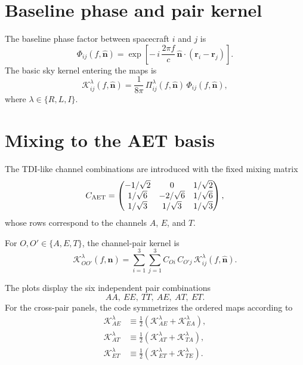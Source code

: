 \documentclass[11pt]{article}
\begin{document}
\section{Baseline phase and pair kernel}

The baseline phase factor between spacecraft $i$ and $j$ is
\begin{equation}
\Phi_{ij}(f,\hat{\bm n})
=
\exp\!\left[
-\,i\,\frac{2\pi f}{c}\,
\hat{\bm n}\cdot(\bm r_i-\bm r_j)
\right].
\end{equation}
The basic sky kernel entering the maps is
\begin{equation}
\mathcal K^\lambda_{ij}(f,\hat{\bm n})
=
\frac{1}{8\pi}\,
\Pi^\lambda_{ij}(f,\hat{\bm n})\,
\Phi_{ij}(f,\hat{\bm n}),
\end{equation}
where $\lambda\in\{R,L,I\}$.

\section{Mixing to the AET basis}

The TDI-like channel combinations are introduced with the fixed mixing matrix
\begin{equation}
C_{\rm AET}
=
\begin{pmatrix}
-1/\sqrt{2} & 0 & 1/\sqrt{2} \\
1/\sqrt{6} & -2/\sqrt{6} & 1/\sqrt{6} \\
1/\sqrt{3} & 1/\sqrt{3} & 1/\sqrt{3}
\end{pmatrix},
\end{equation}
whose rows correspond to the channels $A$, $E$, and $T$.

For $O,O'\in\{A,E,T\}$, the channel-pair kernel is
\begin{equation}
\mathcal K^\lambda_{OO'}(f,\hat{\bm n})
=
\sum_{i=1}^3 \sum_{j=1}^3
C_{Oi}\,C_{O'j}\,
\mathcal K^\lambda_{ij}(f,\hat{\bm n}).
\end{equation}

The plots display the six independent pair combinations
\[
AA,\ EE,\ TT,\ AE,\ AT,\ ET.
\]
For the cross-pair panels, the code symmetrizes the ordered maps according to
\begin{align}
\mathcal K^\lambda_{AE} &\equiv \frac{1}{2}\left(\mathcal K^\lambda_{AE} + \mathcal K^\lambda_{EA}\right), \\
\mathcal K^\lambda_{AT} &\equiv \frac{1}{2}\left(\mathcal K^\lambda_{AT} + \mathcal K^\lambda_{TA}\right), \\
\mathcal K^\lambda_{ET} &\equiv \frac{1}{2}\left(\mathcal K^\lambda_{ET} + \mathcal K^\lambda_{TE}\right).
\end{align}
\end{document}
